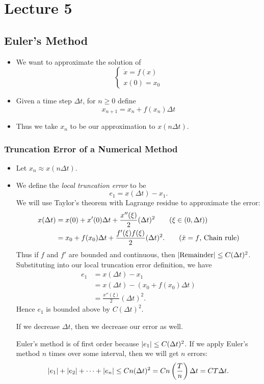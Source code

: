 \documentclass[class=article, crop=false]{standalone}
\begin{document}
  \section{Lecture 5}
  \subsection{Euler's Method}
  \begin{itemize}
    \item We want to approximate the solution of
    \[
      \begin{cases}
        \dot{x} = f(x) \\
        x(0) = x_0
      \end{cases}
    \]
    \item Given a time step $\Delta t$, for $n\geq 0$ define
    \[
      x_{n + 1} = x_n + f(x_n)\Delta t
    \]
    \item Thus we take $x_n$ to be our approximation to $x(n\Delta t)$.
  \end{itemize}
  \subsubsection{Truncation Error of a Numerical Method}
  \begin{itemize}
    \item Let $x_n\approx x(n\Delta t)$.
    \item We define the \emph{local truncation error} to be
    \[
      e_1 = x(\Delta t) - x_1.
    \]
    We will use Taylor's theorem with Lagrange residue to approximate the error:
    \begin{align*}
      x(\Delta t) &= x(0) + x'(0)\Delta t + \frac{x''(\xi)}{2}(\Delta t)^2 \tag{$\xi\in (0, \Delta t)$} \\
                  &= x_0 + f(x_0)\Delta t + \frac{f'(\xi)f(\xi)}{2}(\Delta t)^2. \tag{$\dot{x} = f$, Chain rule}
    \end{align*}
    Thus if $f$ and $f'$ are bounded and continuous, then $\left\lvert \text{Remainder} \right\rvert\leq C(\Delta t)^2$. Substituting into our local truncation error definition, we have
    \begin{align*}
      e_1 &= x(\Delta t) - x_1 \\
          &= x(\Delta t) - (x_0 + f(x_0)\Delta t) \\
          &= \frac{x''(\xi)}{2}(\Delta t)^2.
    \end{align*}
    Hence $e_1$ is bounded above by $C(\Delta t)^2$.
    \begin{note}{}
      If we decrease $\Delta t$, then we decrease our error as well.
    \end{note}
    Euler's method is of first order because $\left\lvert e_1 \right\rvert\leq C(\Delta t)^2$. If we apply Euler's method $n$ times over some interval, then we will get $n$ errors:
    \[
      \left\lvert e_1 \right\rvert + \left\lvert e_2 \right\rvert + \dotsb + \left\lvert e_n \right\rvert\leq Cn(\Delta t)^2 = Cn\left( \frac{T}{n} \right)\Delta t = CT\Delta t.
    \]
  \end{itemize}
\end{document}
